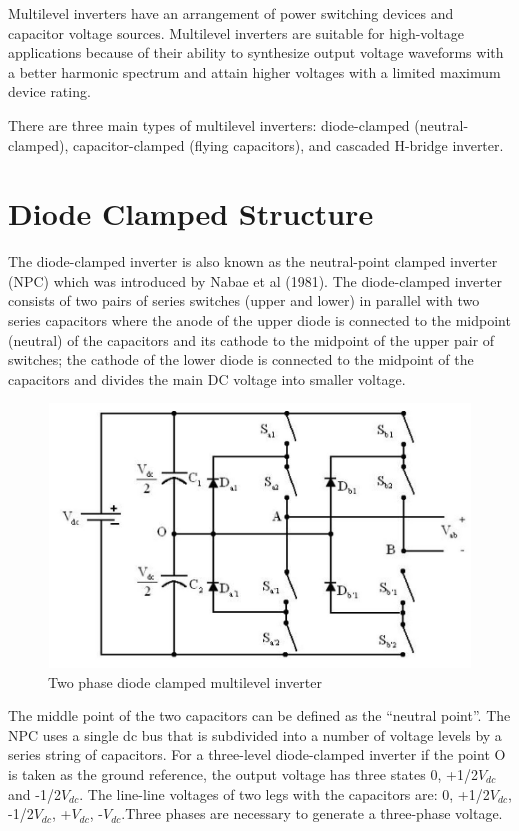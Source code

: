 \documentclass[12pt,a4paper]{report}
\begin{document}
\par 
Multilevel inverters have an arrangement of power switching
devices and capacitor voltage sources. Multilevel inverters are suitable for
high-voltage applications because of their ability to synthesize output voltage
waveforms with a better harmonic spectrum and attain higher voltages with a
limited maximum device rating.
\par
There are three main types of multilevel inverters: diode-clamped
(neutral-clamped), capacitor-clamped (flying capacitors), and cascaded H-bridge
inverter.

\section{Diode Clamped Structure}

The diode-clamped inverter is also known as the neutral-point
clamped inverter (NPC) which was introduced by Nabae et al (1981). The
diode-clamped inverter consists of two pairs of series switches (upper and
lower) in parallel with two series capacitors where the anode of the upper
diode is connected to the midpoint (neutral) of the capacitors and its cathode
to the midpoint of the upper pair of switches; the cathode of the lower diode is
connected to the midpoint of the capacitors and divides the main DC voltage
into smaller voltage.\\

\begin{figure}[h]\centering
	\includegraphics[width=12cm,height=7cm]{figures/diode.jpg}
	\caption{Two phase diode clamped multilevel inverter}
	\label{diode}
\end{figure}
 The middle point of the two capacitors can be defined as the “neutral point”. The NPC uses a single
dc bus that is subdivided into a number of voltage levels by a series string of
capacitors. For a three-level diode-clamped inverter if the point O is taken as
the ground reference, the output voltage has three states
0, +1/2$V_{dc}$ and -1/2$V_{dc}$.
The line-line voltages of two legs with the capacitors are: 0, +1/2$V_{dc}$, -1/2$V_{dc}$, +$V_{dc}$, -$V_{dc}$.Three phases are necessary to generate a three-phase voltage.\\
\end{document}
